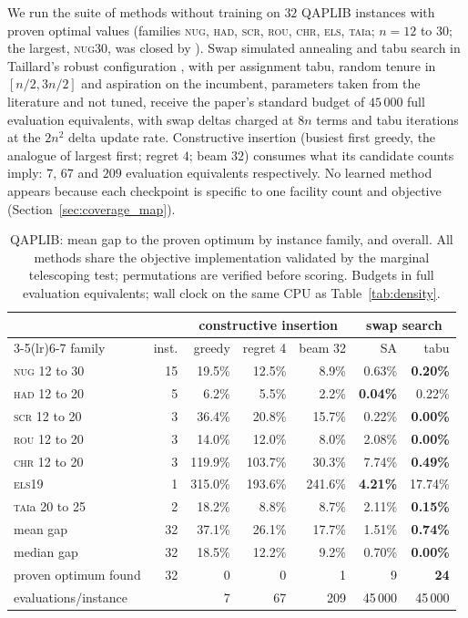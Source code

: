 \documentclass[preprint,12pt,authoryear]{elsarticle}
\begin{document}
We run the suite of methods without training on $32$ QAPLIB instances \citep{Burkard1997QAPLIB}
with proven optimal values (families \textsc{nug}, \textsc{had}, \textsc{scr},
\textsc{rou}, \textsc{chr}, \textsc{els}, \textsc{tai}a; $n=12$ to $30$; the
largest, \textsc{nug30}, was closed by \citealp{Anstreicher2002Nug30}). Swap
simulated annealing and tabu search in Taillard's robust configuration
\citep{Taillard1991Robust}, with per assignment tabu, random tenure in
$[n/2,3n/2]$ and aspiration on the incumbent, parameters taken from the
literature and not tuned, receive the paper's standard budget of $45\,000$
full evaluation equivalents, with swap deltas charged at $8n$ terms and tabu iterations at the
$2n^2$ delta update rate. Constructive insertion (busiest first greedy, the
analogue of largest first; regret $4$; beam $32$) consumes what its candidate
counts imply: $7$, $67$ and $209$ evaluation equivalents respectively. No
learned method appears because each checkpoint is specific to one facility count
and objective (Section~\ref{sec:coverage_map}).

\begin{table}[t]
\centering
\caption{QAPLIB: mean gap to the proven optimum by instance family, and overall.
All methods share the objective implementation validated by the marginal
telescoping test; permutations are verified before scoring. Budgets in
full evaluation equivalents; wall clock on the same CPU as
Table~\ref{tab:density}.}
\label{tab:qap}
\footnotesize
\setlength{\tabcolsep}{3.4pt}
\begin{tabular}{@{}lrrrrrr@{}}
\toprule
 & & \multicolumn{3}{c}{constructive insertion} & \multicolumn{2}{c}{swap search} \\
\cmidrule(lr){3-5}\cmidrule(lr){6-7}
family & inst. & greedy & regret 4 & beam 32 & SA & tabu \\
\midrule
\textsc{nug} 12 to 30 & 15 & 19.5\% & 12.5\% & 8.9\% & 0.63\% & \textbf{0.20\%} \\
\textsc{had} 12 to 20 &  5 &  6.2\% &  5.5\% & 2.2\% & \textbf{0.04\%} & 0.22\% \\
\textsc{scr} 12 to 20 &  3 & 36.4\% & 20.8\% & 15.7\% & 0.22\% & \textbf{0.00\%} \\
\textsc{rou} 12 to 20 &  3 & 14.0\% & 12.0\% & 8.0\% & 2.08\% & \textbf{0.00\%} \\
\textsc{chr} 12 to 20 &  3 & 119.9\% & 103.7\% & 30.3\% & 7.74\% & \textbf{0.49\%} \\
\textsc{els19}      &  1 & 315.0\% & 193.6\% & 241.6\% & \textbf{4.21\%} & 17.74\% \\
\textsc{tai}a 20 to 25 & 2 & 18.2\% &  8.8\% & 8.7\% & 2.11\% & \textbf{0.15\%} \\
\midrule
mean gap            & 32 & 37.1\% & 26.1\% & 17.7\% & 1.51\% & \textbf{0.74\%} \\
median gap          & 32 & 18.5\% & 12.2\% & 9.2\% & 0.70\% & \textbf{0.00\%} \\
proven optimum found & 32 & 0 & 0 & 1 & 9 & \textbf{24} \\
evaluations/instance &   & 7 & 67 & 209 & 45\,000 & 45\,000 \\
\bottomrule
\end{tabular}
\end{table}
\end{document}
